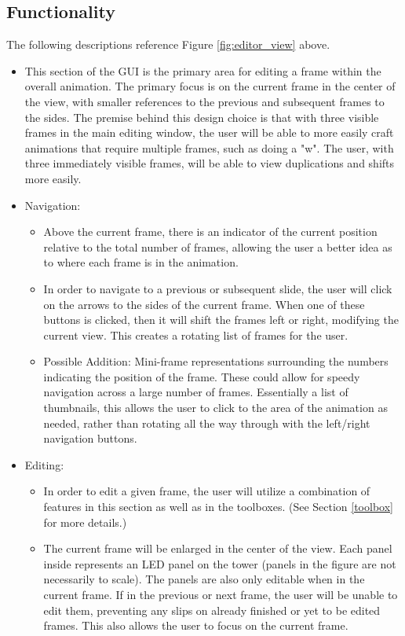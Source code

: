 \documentclass[12pt]{extarticle}
\begin{document}
	\subsection{Functionality}
	The following descriptions reference Figure \ref{fig:editor_view} above.
	\begin{itemize}
		\item This section of the GUI is the primary area for editing a frame within the overall animation. The primary focus is on the current frame in the center of the view, with smaller references to the previous and subsequent frames to the sides.  The premise behind this design choice is that with three visible frames in the main editing window, the user will be able to more easily craft animations that require multiple frames, such as doing a "w".  The user, with three immediately visible frames, will be able to view duplications and shifts more easily.
		\item Navigation:
		\begin{itemize}
			\item Above the current frame, there is an indicator of the current position relative to the total number of frames, allowing the user a better idea as to where each frame is in the animation.
			\item In order to navigate to a previous or subsequent slide, the user will click on the arrows to the sides of the current frame.  When one of these buttons is clicked, then it will shift the frames left or right, modifying the current view.  This creates a rotating list of frames for the user.
			\item Possible Addition: Mini-frame representations surrounding the numbers indicating the position of the frame. These could allow for speedy navigation across a large number of frames.  Essentially a list of thumbnails, this allows the user to click to the area of the animation as needed, rather than rotating all the way through with the left/right navigation buttons.
		\end{itemize}
		\item Editing:
		\begin{itemize}
			\item In order to edit a given frame, the user will utilize a combination of features in this section as well as in the toolboxes. (See Section \ref{toolbox} for more details.)
			\item The current frame will be enlarged in the center of the view. Each panel inside represents an LED panel on the tower (panels in the figure are not necessarily to scale).  The panels are also only editable when in the current frame.  If in the previous or next frame, the user will be unable to edit them, preventing any slips on already finished or yet to be edited frames.  This also allows the user to focus on the current frame.

\end{itemize}
\end{itemize}
\end{document}
